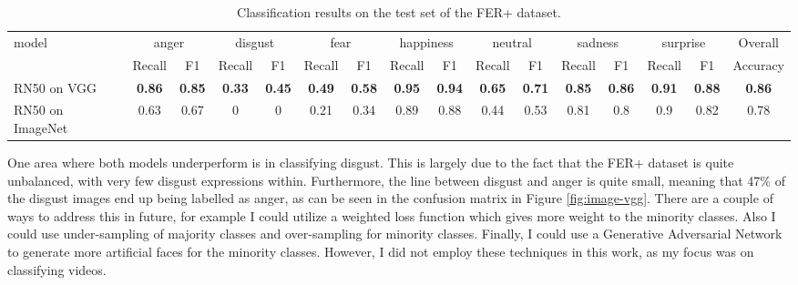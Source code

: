 \documentclass[sigconf]{acmart}
\begin{document}
{\begin{table}[htbp]
\caption{Classification results on the test set of the FER+ dataset.}
\label{tab:imageres}
\begin{tabular}{lccccccccccccccc}
\multirow{2}{*}{model} & \multicolumn{2}{c}{anger} &
\multicolumn{2}{c}{disgust} & \multicolumn{2}{c}{fear} &
\multicolumn{2}{c}{happiness} & \multicolumn{2}{c}{neutral} &
\multicolumn{2}{c}{sadness} & \multicolumn{2}{c}{surprise}  & Overall\\ \cline{2-16}
                       & Recall        & F1        
		       & Recall        & F1        & Recall        & F1
		       &  Recall        & F1        &  Recall        & F1
		       & Recall        & F1        & Recall        & F1    &
		       Accuracy    \\ \hline
RN50 on VGG & \textbf{0.86} &\textbf{0.85} &\textbf{0.33} &\textbf{0.45} &\textbf{0.49} &\textbf{0.58} &\textbf{0.95} &\textbf{0.94} &\textbf{0.65} &\textbf{0.71} &\textbf{0.85} &\textbf{0.86} &\textbf{0.91} &\textbf{0.88} &\textbf{0.86} \\
RN50 on ImageNet   & 0.63 &0.67 &0 &0 &0.21 &0.34 &0.89 &0.88 &0.44 &0.53 &0.81 &0.8 &0.9 &0.82 &0.78 \\
\end{tabular}
\end{table}

One area where both models underperform is in classifying disgust. This is largely
due to the fact that the FER+ dataset is quite unbalanced, with very few
disgust expressions within. Furthermore, the line between disgust and anger is
quite small, meaning that 47\% of the disgust images end up being labelled as
anger,
as can be seen in the confusion matrix in Figure \ref{fig:image-vgg}. There
are a couple of ways to address this in future, for example I could utilize a
weighted loss function which gives more weight to the minority
classes. Also I could use under-sampling of majority classes and over-sampling
for minority classes. Finally, I could use a Generative
Adversarial Network to generate more artificial faces for the minority
classes. However, I did not employ these techniques in this work, as my focus
was on classifying videos.

}
\end{document}
